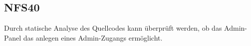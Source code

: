 \subsection*{NFS40}

Durch \gls{statische Analyse} des \Gls{Quellcode}s kann überprüft werden, ob das \Gls{Admin-Panel} das anlegen eines \Gls{Admin-Zugang}s ermöglicht.